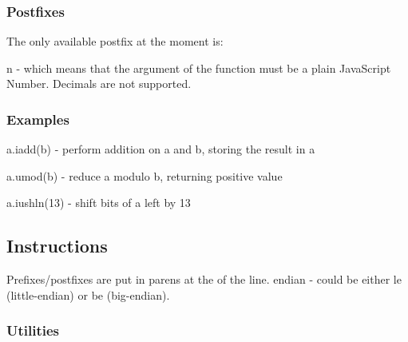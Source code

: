 \subsubsection*{Postfixes}

The only available postfix at the moment is\+:


\begin{DoxyItemize}
\item {\ttfamily n} -\/ which means that the argument of the function must be a plain Java\+Script Number. Decimals are not supported.
\end{DoxyItemize}

\subsubsection*{Examples}


\begin{DoxyItemize}
\item {\ttfamily a.\+iadd(b)} -\/ perform addition on {\ttfamily a} and {\ttfamily b}, storing the result in {\ttfamily a}
\item {\ttfamily a.\+umod(b)} -\/ reduce {\ttfamily a} modulo {\ttfamily b}, returning positive value
\item {\ttfamily a.\+iushln(13)} -\/ shift bits of {\ttfamily a} left by 13
\end{DoxyItemize}

\subsection*{Instructions}

Prefixes/postfixes are put in parens at the of the line. {\ttfamily endian} -\/ could be either {\ttfamily le} (little-\/endian) or {\ttfamily be} (big-\/endian).

\subsubsection*{Utilities}


